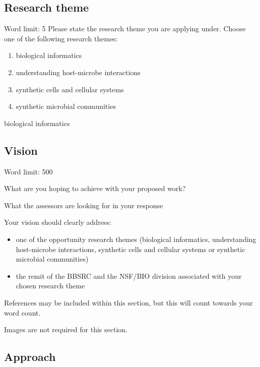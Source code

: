 \documentclass[12in]{article}
\begin{document}
\subsection{Research theme}

{\color{red}
Word limit: 5
Please state the research theme you are applying under. Choose one of the following research themes:

\begin{enumerate}
	\item biological informatics
	\item understanding host-microbe interactions
	\item synthetic cells and cellular systems
	\item synthetic microbial communities
\end{enumerate}
}

biological informatics

\subsection{Vision}

{\color{red}
Word limit: 500

What are you hoping to achieve with your proposed work?

What the assessors are looking for in your response

Your vision should clearly address:

\begin{itemize}

	\item one of the opportunity research themes (biological informatics,
understanding host-microbe interactions, synthetic cells and cellular systems
or synthetic microbial communities)

	\item the remit of the BBSRC and the NSF/BIO division associated with your
chosen research theme

\end{itemize}

References may be included within this section, but this will count towards your
word count.

Images are not required for this section.
}



\subsection{Approach}
\end{document}
